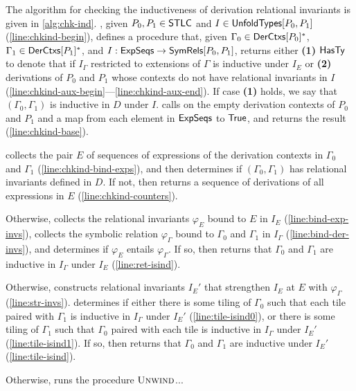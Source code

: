 %
The algorithm \chkinductive for checking the inductiveness of
derivation relational invariants is given in
\autoref{alg:chk-ind}.
%
\chkinductive, given $P_0, P_1 \in \mathsf{STLC}$ and $I \in
\mathsf{UnfoldTypes}[ P_0, P_1 ]$ (\autoref{line:chkind-begin}), defines a
procedure \chkindaux that, given $\Gamma_0 \in \mathsf{DerCtxs}[ P_0 ]^{*}$,
$\Gamma_1 \in \mathsf{DerCtxs}[ P_1 ]^{*}$, and $I: \mathsf{ExpSeqs} \to
\mathsf{SymRels}[ P_0, P_1 ]$, returns either %
\textbf{(1)} $\mathsf{HasTy}$ to denote that if $I_{\Gamma}$ restricted to
extensions of $\Gamma$ is inductive under $I_E$
%
%
or
%
%
\textbf{(2)} derivations of $P_0$ and $P_1$ whose contexts do not have
relational invariants in $I$
(\autoref{line:chkind-aux-begin}---\autoref{line:chkind-aux-end}).
%
If case \textbf{(1)} holds, we say that $(\Gamma_0, \Gamma_1)$ is
inductive in $D$ under $I$.
%
\chkinductive calls \chkindaux on the empty derivation contexts of
$P_0$ and $P_1$ and a map from each element in $\mathsf{ExpSeqs}$ to
$\mathsf{True}$, and returns the result (\autoref{line:chkind-base}).

\chkindaux collects the pair $E$ of sequences of expressions of the
derivation contexts in $\Gamma_0$ and $\Gamma_1$
(\autoref{line:chkind-bind-exps}), and then determines if $(\Gamma_0,
\Gamma_1)$ has relational invariants defined in $D$.
%
If not, then \chkindaux returns a sequence of derivations of all
expressions in $E$ (\autoref{line:chkind-counters}).

Otherwise, \chkindaux collects the relational invariants $\varphi_E$
bound to $E$ in $I_E$ (\autoref{line:bind-exp-invs}), %
collects the symbolic relation $\varphi_{\Gamma}$ bound to $\Gamma_0$
and $\Gamma_1$ in $I_{\Gamma}$ (\autoref{line:bind-der-invs}), and %
determines if $\varphi_E$ entails $\varphi_{\Gamma}$.
%
If so, then \chkindaux returns that $\Gamma_0$ and $\Gamma_1$ are
inductive in $I_{\Gamma}$ under $I_E$ (\autoref{line:ret-isind}).

Otherwise, \chkindaux constructs relational invariants $I_E'$ that
strengthen $I_E$ at $E$ with $\varphi_{\Gamma}$
(\autoref{line:str-invs}).
%
\chkindaux determines if either there is some tiling of $\Gamma_0$
such that each tile paired with $\Gamma_1$ is inductive in
$I_{\Gamma}$ under $I_E'$ (\autoref{line:tile-isind0}), or there is
some tiling of $\Gamma_1$ such that $\Gamma_0$ paired with each tile
is inductive in $I_{\Gamma}$ under $I_E'$ (\autoref{line:tile-isind1}).
%
If so, then \chkindaux returns that $\Gamma_0$ and $\Gamma_1$ are
inductive under $I_E'$ (\autoref{line:tile-isind}).

Otherwise, \chkindaux runs the procedure $\textsc{Unwind}$...


